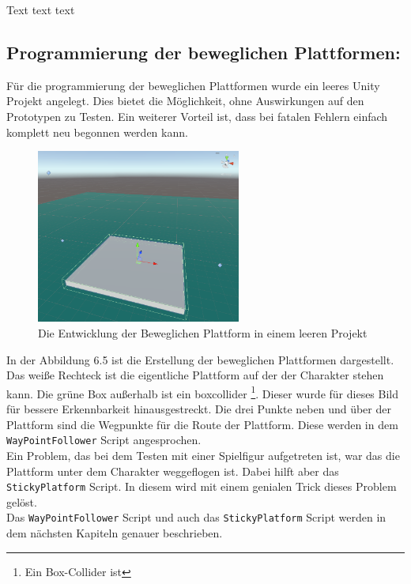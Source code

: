 Text text text

\pagebreak

\subsection{Programmierung der beweglichen Plattformen:}

Für die programmierung der beweglichen Plattformen wurde ein leeres Unity Projekt angelegt. Dies bietet die Möglichkeit, ohne Auswirkungen auf den Prototypen zu Testen. Ein weiterer Vorteil ist, dass bei fatalen Fehlern einfach komplett neu begonnen werden kann. 

\begin{figure}[h]
  \centering
  \includegraphics*[width=0.6\textwidth]{chapters/04/images/V1/MovingPlatformV1.png}
  \caption{Die Entwicklung der Beweglichen Plattform in einem leeren Projekt}
  \label{fig:PE04}
\end{figure}

In der Abbildung 6.5 ist die Erstellung der beweglichen Plattformen dargestellt. Das weiße Rechteck ist die eigentliche Plattform auf der der Charakter stehen kann. Die grüne Box außerhalb ist ein \gls{boxcollider} \footnote[1]{Ein Box-Collider ist}. Dieser wurde für dieses Bild für bessere Erkennbarkeit hinausgestreckt. Die drei Punkte neben und über der Plattform sind die Wegpunkte für die Route der Plattform. Diese werden in dem \verb+WayPointFollower+ Script angesprochen. \\

Ein Problem, das bei dem Testen mit einer Spielfigur aufgetreten ist, war das die Plattform unter dem Charakter weggeflogen ist. Dabei hilft aber das \verb+StickyPlatform+ Script. In diesem wird mit einem genialen Trick dieses Problem gelöst.\\

Das \verb+WayPointFollower+ Script und auch das \verb+StickyPlatform+ Script werden in dem nächsten Kapiteln genauer beschrieben. 

